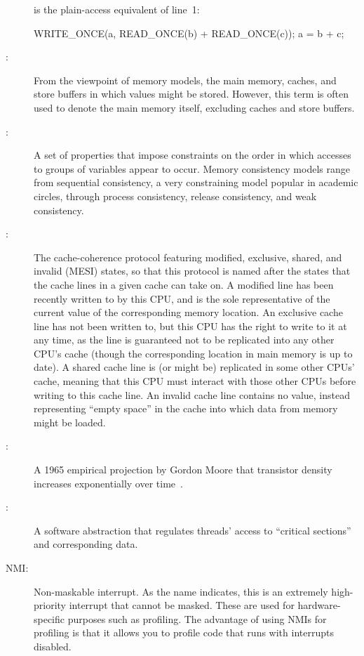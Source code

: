\begin{description}
	is the plain-access equivalent of line~1:
	\begin{VerbatimN}
	WRITE_ONCE(a, READ_ONCE(b) + READ_ONCE(c));
	a = b + c;
	\end{VerbatimN}
\item[\IXG{Memory}:]
	From the viewpoint of memory models, the main memory,
	caches, and store buffers in which values might be stored.
	However, this term is often used to denote the main memory
	itself, excluding caches and store buffers.
\item[\IXGh{Memory}{Consistency}:]
	A set of properties that impose constraints on the order in
	which accesses to groups of variables appear to occur.
	Memory consistency models range from sequential consistency,
	a very constraining model popular in academic circles, through
	process consistency, release consistency, and weak consistency.
\item[\IXGaltr{MESI Protocol}{MESI protocol}:]
	The
	cache-coherence protocol featuring
	modified, exclusive, shared, and invalid (MESI) states,
	so that this protocol is named after the states that the
	cache lines in a given cache can take on.
	A modified line has been recently written to by this CPU,
	and is the sole representative of the current value of
	the corresponding memory location.
	An exclusive cache line has not been written to, but this
	CPU has the right to write to it at any time, as the line
	is guaranteed not to be replicated into any other CPU's cache
	(though the corresponding location in main memory is up to date).
	A shared cache line is (or might be) replicated in some other
	CPUs' cache, meaning that this CPU must interact with those other
	CPUs before writing to this cache line.
	An invalid cache line contains no value, instead representing
	``empty space'' in the cache into which data from memory might
	be loaded.
\item[\IXGaltr{Moore's Law}{Moore's Law}:]
	A 1965 empirical projection by Gordon Moore that
	transistor density increases exponentially over
	time~\cite{GordonMoore1965MooresLaw}.
\item[\IXG{Mutual-Exclusion Mechanism}:]
	A software abstraction that regulates threads' access to
	``critical sections'' and corresponding data.
\item[NMI:]
	Non-maskable interrupt.
	As the name indicates, this is an extremely high-priority
	interrupt that cannot be masked.
	These are used for hardware-specific purposes such as profiling.
	The advantage of using NMIs for profiling is that it allows you
	to profile code that runs with interrupts disabled.

\end{description}
